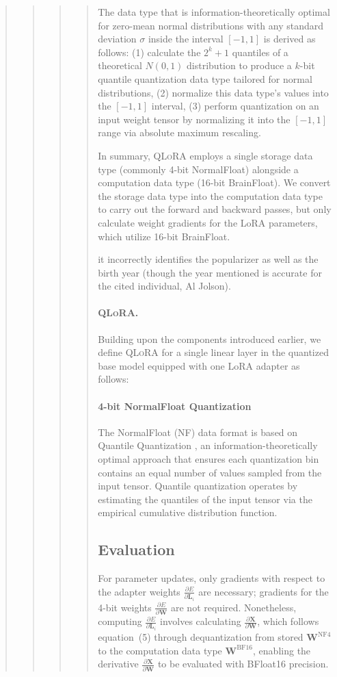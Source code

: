 \begin{quote}
\begin{quote}
\begin{quote}
\begin{quote}
The data type that is information-theoretically optimal for zero-mean normal distributions with any standard deviation $\sigma$ inside the interval $[-1, 1]$ is derived as follows: (1) calculate the $2^k+1$ quantiles of a theoretical $N(0, 1)$ distribution to produce a $k$-bit quantile quantization data type tailored for normal distributions, (2) normalize this data type’s values into the $[-1, 1]$ interval, (3) perform quantization on an input weight tensor by normalizing it into the $[-1, 1]$ range via absolute maximum rescaling.

In summary, \textsc{QLoRA} employs a single storage data type (commonly 4-bit NormalFloat) alongside a computation data type (16-bit BrainFloat). We convert the storage data type into the computation data type to carry out the forward and backward passes, but only calculate weight gradients for the LoRA parameters, which utilize 16-bit BrainFloat.

it incorrectly identifies the popularizer as well as the birth year (though the year mentioned is accurate for the cited individual, Al Jolson).

\paragraph{\textsc{QLoRA}.} Building upon the components introduced earlier, we define \textsc{QLoRA} for a single linear layer in the quantized base model equipped with one LoRA adapter as follows:

\paragraph{4-bit NormalFloat Quantization} The NormalFloat (NF) data format is based on Quantile Quantization \citep{dettmers2022optimizers}, an information-theoretically optimal approach that ensures each quantization bin contains an equal number of values sampled from the input tensor. Quantile quantization operates by estimating the quantiles of the input tensor via the empirical cumulative distribution function.

\subsection{Evaluation}

For parameter updates, only gradients with respect to the adapter weights $\frac{\partial E}{\partial \mathbf{L}_i}$ are necessary; gradients for the 4-bit weights $\frac{\partial E}{\partial \mathbf{W}}$ are not required. Nonetheless, computing $\frac{\partial E}{\partial \mathbf{L}_i}$ involves calculating $\frac{\partial \mathbf{X}}{\partial \mathbf{W}}$, which follows equation~(5) through dequantization from stored $\mathbf{W}^{\text{NF4}}$ to the computation data type $\mathbf{W}^{\text{BF16}}$, enabling the derivative $\frac{\partial \mathbf{X}}{\partial \mathbf{W}}$ to be evaluated with BFloat16 precision.


\end{quote}
\end{quote}
\end{quote}
\end{quote}

